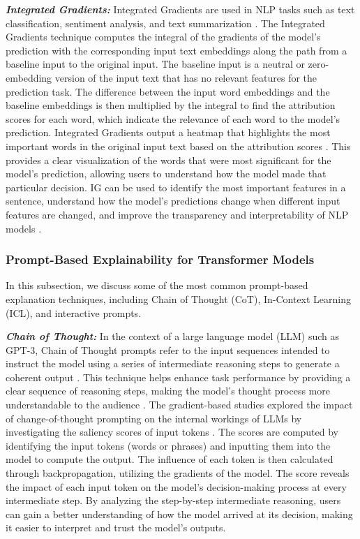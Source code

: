 \documentclass[final,5p,times,twocolumn]{elsarticle}
\begin{document}
\textbf{\textit{Integrated Gradients:}}
Integrated Gradients are used in NLP tasks such as text classification, sentiment analysis, and text summarization \cite{pmlr-v70-sundararajan17a}. The Integrated Gradients technique computes the integral of the gradients of the model's prediction with the corresponding input text embeddings along the path from a baseline input to the original input. The baseline input is a neutral or zero-embedding version of the input text that has no relevant features for the prediction task. The difference between the input word embeddings and the baseline embeddings is then multiplied by the integral to find the attribution scores for each word, which indicate the relevance of each word to the model's prediction. Integrated Gradients output a heatmap that highlights the most important words in the original input text based on the attribution scores \cite{shrikumar2017learning}. This provides a clear visualization of the words that were most significant for the model's prediction, allowing users to understand how the model made that particular decision. IG can be used to identify the most important features in a sentence, understand how the model's predictions change when different input features are changed, and improve the transparency and interpretability of NLP models \cite{montavon2017explaining}.

\subsubsection{Prompt-Based Explainability for Transformer Models}
In this subsection, we discuss some of the most common prompt-based explanation techniques, including Chain of Thought (CoT), In-Context Learning (ICL), and interactive prompts.


\textbf{\textit{Chain of Thought:}}
In the context of a large language model (LLM) such as GPT-3\cite{brown2020language}, Chain of Thought prompts refer to the input sequences intended to instruct the model using a series of intermediate reasoning steps to generate a coherent output \cite{wei2022chain, white2023prompt}. This technique helps enhance task performance by providing a clear sequence of reasoning steps, making the model’s thought process more understandable to the audience \cite{jie2024interpretable}. The gradient-based studies explored the impact of change-of-thought prompting on the internal workings of LLMs by investigating the saliency scores of input tokens \cite{wu2023analyzing}. The scores are computed by identifying the input tokens (words or phrases) and inputting them into the model to compute the output. The influence of each token is then calculated through backpropagation, utilizing the gradients of the model. The score reveals the impact of each input token on the model's decision-making process at every intermediate step. By analyzing the step-by-step intermediate reasoning, users can gain a better understanding of how the model arrived at its decision, making it easier to interpret and trust the model's outputs. 
\end{document}
